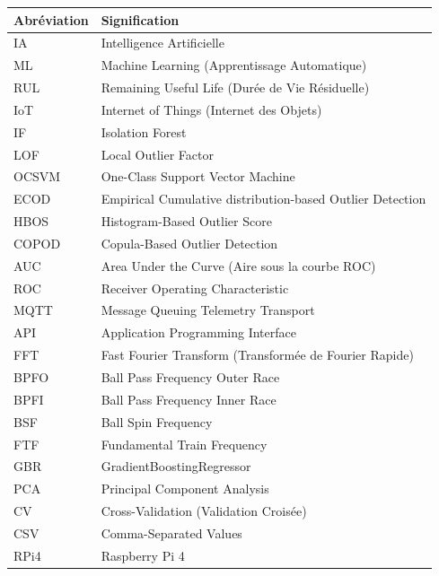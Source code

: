\documentclass[12pt,a4paper]{report}
\begin{document}
\begin{tabular}{p{2.5cm}p{10cm}}
\toprule
\textbf{Abréviation} & \textbf{Signification} \\
\midrule
IA     & Intelligence Artificielle \\
ML     & Machine Learning (Apprentissage Automatique) \\
RUL    & Remaining Useful Life (Durée de Vie Résiduelle) \\
IoT    & Internet of Things (Internet des Objets) \\
IF     & Isolation Forest \cite{liu2008} \\
LOF    & Local Outlier Factor \cite{breunig2000} \\
OCSVM  & One-Class Support Vector Machine \cite{scholkopf2001} \\
ECOD   & Empirical Cumulative distribution-based Outlier Detection \cite{li2021} \\
HBOS   & Histogram-Based Outlier Score \cite{goldstein2012} \\
COPOD  & Copula-Based Outlier Detection \cite{li2022} \\
AUC    & Area Under the Curve (Aire sous la courbe ROC) \cite{fawcett2006} \\
ROC    & Receiver Operating Characteristic \cite{fawcett2006} \\
MQTT   & Message Queuing Telemetry Transport \\
API    & Application Programming Interface \\
FFT    & Fast Fourier Transform (Transformée de Fourier Rapide) \cite{cooley1965} \\
BPFO   & Ball Pass Frequency Outer Race \cite{randall2011} \\
BPFI   & Ball Pass Frequency Inner Race \cite{randall2011} \\
BSF    & Ball Spin Frequency \cite{randall2011} \\
FTF    & Fundamental Train Frequency \cite{randall2011} \\
GBR    & GradientBoostingRegressor \cite{friedman2001} \\
PCA    & Principal Component Analysis \cite{pedregosa2011} \\
CV     & Cross-Validation (Validation Croisée) \\
CSV    & Comma-Separated Values \\
RPi4   & Raspberry Pi 4 \\
\bottomrule
\end{tabular}
\end{document}
